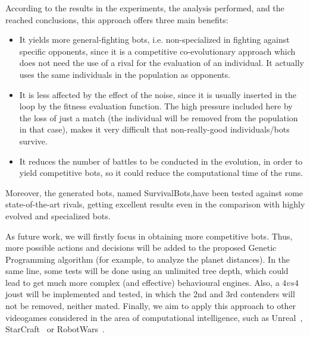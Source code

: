 \documentclass[conference]{IEEEtran}
\begin{document}
According to the results in the experiments, the analysis performed, and the reached conclusions, this approach offers three main benefits: 
\begin{itemize}
\item It yields more general-fighting bots, i.e. non-specialized in fighting against specific opponents, since it is a competitive co-evolutionary approach which does not need the use of a rival for the evaluation of an individual. It actually uses the same individuals in the population as opponents.
\item It is less affected by the effect of the noise, since it is usually inserted in the loop by the fitness evaluation function. The high pressure included here by the loss of just a match (the individual will be removed from the population in that case), makes it very difficult that non-really-good individuals/bots survive.
\item It reduces the number of battles to be conducted in the evolution, in order to yield competitive bots, so it could reduce the computational time of the runs.
\end{itemize}

Moreover, the generated bots, named SurvivalBots,have been tested against some state-of-the-art rivals, getting excellent results even in the comparison with highly evolved and specialized bots.

As future work, we will firstly focus in obtaining more competitive bots. Thus, more possible actions and decisions will be added to the proposed Genetic Programming algorithm (for example, to analyze the planet distances). In the same line, some tests will be done using an unlimited tree depth, which could lead to get much more complex (and effective) behavioural engines.
Also, a $4vs4$ joust will be implemented and tested, in which the 2nd and 3rd contenders will not be removed, neither mated. 
Finally, we aim to apply this approach to other videogames considered in the area of computational intelligence, such as Unreal\texttrademark~, StarCraft\texttrademark~ or RobotWars\texttrademark~.




\end{document}
